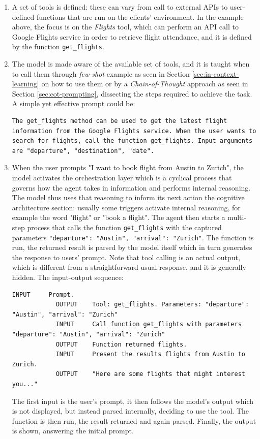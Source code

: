 \begin{enumerate}
    \item A set of tools is defined: these can vary from call to external APIs to user-defined functions that are run on the clients' environment. In the example above, the focus is on the \textit{Flights} tool, which can perform an API call to Google Flights service in order to retrieve flight attendance, and it is defined by the function \verb|get_flights|.
    \item The model is made aware of the available set of tools, and it is taught when to call them through \textit{few-shot} example as seen in Section \ref{sec:in-context-learning} on how to use them or by a \textit{Chain-of-Thought} approach as seen in Section \ref{sec:cot-prompting}, dissecting the steps required to achieve the task. A simple yet effective prompt could be:
    
    \begin{Verbatim}[breaklines=true]
    The get_flights method can be used to get the latest flight information from the Google Flights service. When the user wants to search for flights, call the function get_flights. Input arguments are "departure", "destination", "date".
    \end{Verbatim}

    \item When the user prompts "I want to book flight from Austin to Zurich", the model activates the orchestration layer which is a cyclical process that governs how the agent takes in information and performs internal reasoning. The model thus uses that reasoning to inform its next action the cognitive architecture section: usually some triggers activate internal reasoning, for example the word "flight" or "book a flight". The agent then starts a multi-step process that calls the function \verb|get_flights| with the captured parameters \verb|"departure": "Austin", "arrival": "Zurich"|. The function is run, the returned result is parsed by the model itself which in turn generates the response to users' prompt.
    Note that tool calling is an actual output, which is different from a straightforward usual response, and it is generally hidden. The input-output sequence:
        \begin{Verbatim}[breaklines=true]
            INPUT     Prompt.
            OUTPUT    Tool: get_flights. Parameters: "departure": "Austin", "arrival": "Zurich"
            INPUT     Call function get_flights with parameters "departure": "Austin", "arrival": "Zurich"
            OUTPUT    Function returned flights.
            INPUT     Present the results flights from Austin to Zurich.
            OUTPUT    "Here are some flights that might interest you..."
        \end{Verbatim}
    The first input is the user's prompt, it then follows the model's output which is not displayed, but instead parsed internally, deciding to use the tool. The function is then run, the result returned and again parsed. Finally, the output is shown, answering the initial prompt.
\end{enumerate}

